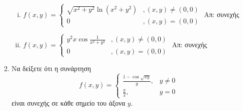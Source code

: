 \begin{enumerate}
\begin{enumerate}[i)]
    \item $ f(x,y) = 
        \begin{cases}
            \sqrt{x^{2}+y^{2}}\ln(x^{2}+y^{2}) &, (x,y)\neq (0,0) \\
            0 &, (x,y)=(0,0)
        \end{cases}
        $ \hfill Απ: συνεχής
    \item   \(
        f(x,y)=\begin{cases}
            y^{2}x\cos \frac{1}{x^{2}+y^{2}} &, (x,y)\neq (0,0)\\
            0 &, (x,y)=(0,0)
        \end{cases}
        \) \hfill Απ: συνεχής
        \end{enumerate}

    \item Να δείξετε ότι η συνάρτηση 
        \[
            f(x,y) = 
            \begin{cases}
                \frac{1- \cos{\sqrt{xy}}}{y}, & y \neq 0 \\ \frac{x}{2}, & y = 0  
            \end{cases}
        \] 
        είναι συνεχής σε κάθε σημείο του άξονα $ y $.
\end{enumerate}


